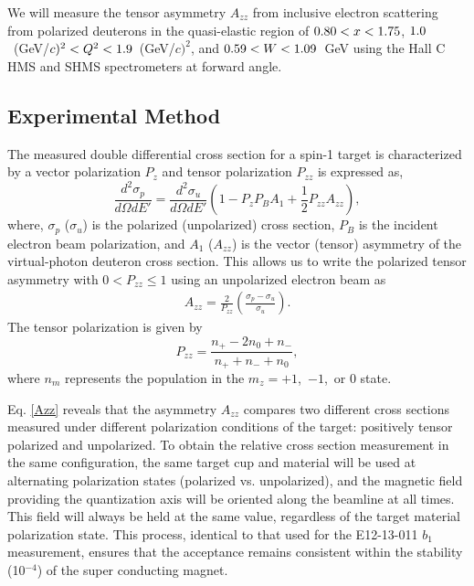 We will measure the tensor asymmetry $A_{zz}$ from inclusive electron scattering from polarized deuterons in the quasi-elastic region of $0.80<x<1.75$, $1.0$~(GeV/$c)^2 < Q^2 <1.9$~(GeV/$c)^2$, and $0.59 < W < 1.09$~GeV using the Hall C HMS and SHMS spectrometers at forward angle.


\subsection{Experimental Method} %

The measured double differential cross section for a spin-1 target is characterized by a vector polarization $P_{z}$ and tensor polarization
$P_{zz}$ is expressed as,
\begin{equation}
\frac{d^2\sigma_p}{d\Omega dE'}=\frac{d^2\sigma_u}{d\Omega dE'}\left(1-P_zP_BA_1+\frac{1}{2}P_{zz}A_{zz}\right),
\label{eq:one}
\end{equation}
where, $\sigma_p$ ($\sigma_u$) is the polarized (unpolarized) cross section, $P_B$ is the incident electron beam polarization, and $A_1$ ($A_{zz}$) is the
vector (tensor) asymmetry of the virtual-photon deuteron cross section.  This allows us to write
the polarized tensor asymmetry with $0<P_{zz}\leq 1$ using an unpolarized electron beam as
\begin{eqnarray}
\label{Azz}
A_{zz} = \frac{2}{P_{zz}}\left(\frac{\sigma_p - \sigma_u}{\sigma_u}\right).
\end{eqnarray}
The tensor polarization is given by 
\begin{equation}
P_{zz}=\frac{n_+-2n_0+n_-}{n_++n_-+n_0},
\end{equation}
where $n_m$ represents the population in the $m_z=+1$,~$-1$,~or $0$ state.

Eq. \ref{Azz} reveals that the asymmetry $A_{zz}$ compares two different cross sections measured under different polarization conditions of the target: positively tensor polarized and unpolarized.  
To obtain the relative cross section measurement in the same configuration, the same target cup and material will be used at alternating polarization states (polarized vs. unpolarized),  and the magnetic field providing the quantization axis will be oriented along the beamline at all times.
This field will always be held at the same value, regardless of the target material polarization state. 
This process, identical to that used for the E12-13-011 $b_1$ measurement, ensures that the acceptance remains consistent within the stability (10$^{-4}$) of the super conducting magnet.  


